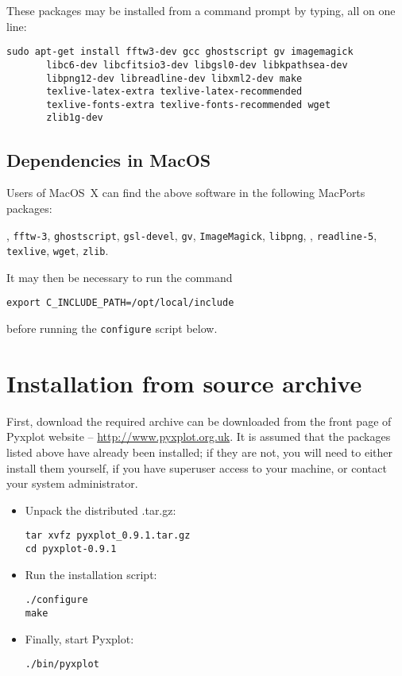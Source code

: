\noindent These packages may be installed from a command prompt by typing, all on one line:

\begin{verbatim}
sudo apt-get install fftw3-dev gcc ghostscript gv imagemagick
       libc6-dev libcfitsio3-dev libgsl0-dev libkpathsea-dev
       libpng12-dev libreadline-dev libxml2-dev make
       texlive-latex-extra texlive-latex-recommended
       texlive-fonts-extra texlive-fonts-recommended wget
       zlib1g-dev
\end{verbatim}

\subsection{Dependencies in MacOS}

Users of MacOS~X can find the above software in the following MacPorts packages:

\vspace{2mm}
, {\tt fftw-3}, {\tt ghostscript}, {\tt gsl-devel}, {\tt gv}, {\tt ImageMagick}, {\tt libpng},\newline
{}, {\tt readline-5}, {\tt texlive}, {\tt wget}, {\tt zlib}.
\vspace{2mm}

It may then be necessary to run the command
\begin{verbatim}
export C_INCLUDE_PATH=/opt/local/include
\end{verbatim}
before running the {\tt configure} script below.

\section{Installation from source archive}

First, download the required archive can be downloaded from the front page of
Pyxplot website -- \url{http://www.pyxplot.org.uk}. It is assumed that the
packages listed above have already been installed; if they are not, you will
need to either install them yourself, if you have superuser access to your
machine, or contact your system administrator.

\begin{itemize}
\item Unpack the distributed .tar.gz:

\begin{verbatim}
tar xvfz pyxplot_0.9.1.tar.gz
cd pyxplot-0.9.1
\end{verbatim}

\item Run the installation script:

\begin{verbatim}
./configure
make
\end{verbatim}

\item Finally, start Pyxplot:

\begin{verbatim}
./bin/pyxplot
\end{verbatim}

\end{itemize}

